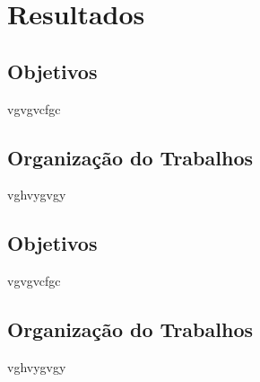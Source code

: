 \chapter{Resultados}



\section{Objetivos}

vgvgvcfgc

\section{Organização do Trabalhos}

 vghvygvgy



\section{Objetivos}

vgvgvcfgc

\section{Organização do Trabalhos}

 vghvygvgy